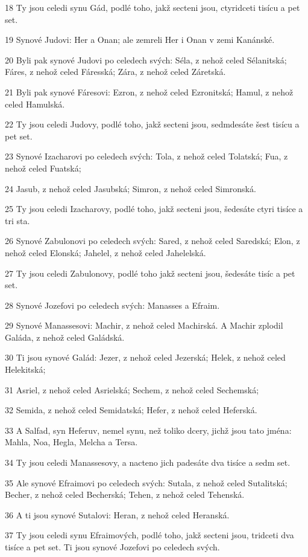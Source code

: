 \par 18 Ty jsou celedi synu Gád, podlé toho, jakž secteni jsou, ctyridceti tisícu a pet set.
\par 19 Synové Judovi: Her a Onan; ale zemreli Her i Onan v zemi Kanánské.
\par 20 Byli pak synové Judovi po celedech svých: Séla, z nehož celed Sélanitská; Fáres, z nehož celed Fáresská; Zára, z nehož celed Záretská.
\par 21 Byli pak synové Fáresovi: Ezron, z nehož celed Ezronitská; Hamul, z nehož celed Hamulská.
\par 22 Ty jsou celedi Judovy, podlé toho, jakž secteni jsou, sedmdesáte šest tisícu a pet set.
\par 23 Synové Izacharovi po celedech svých: Tola, z nehož celed Tolatská; Fua, z nehož celed Fuatská;
\par 24 Jasub, z nehož celed Jasubská; Simron, z nehož celed Simronská.
\par 25 Ty jsou celedi Izacharovy, podlé toho, jakž secteni jsou, šedesáte ctyri tisíce a tri sta.
\par 26 Synové Zabulonovi po celedech svých: Sared, z nehož celed Saredská; Elon, z nehož celed Elonská; Jahelel, z nehož celed Jahelelská.
\par 27 Ty jsou celedi Zabulonovy, podlé toho jakž secteni jsou, šedesáte tisíc a pet set.
\par 28 Synové Jozefovi po celedech svých: Manasses a Efraim.
\par 29 Synové Manassesovi: Machir, z nehož celed Machirská. A Machir zplodil Galáda, z nehož celed Galádská.
\par 30 Ti jsou synové Galád: Jezer, z nehož celed Jezerská; Helek, z nehož celed Helekitská;
\par 31 Asriel, z nehož celed Asrielská; Sechem, z nehož celed Sechemská;
\par 32 Semida, z nehož celed Semidatská; Hefer, z nehož celed Heferská.
\par 33 A Salfad, syn Heferuv, nemel synu, než toliko dcery, jichž jsou tato jména: Mahla, Noa, Hegla, Melcha a Tersa.
\par 34 Ty jsou celedi Manassesovy, a nacteno jich padesáte dva tisíce a sedm set.
\par 35 Ale synové Efraimovi po celedech svých: Sutala, z nehož celed Sutalitská; Becher, z nehož celed Becherská; Tehen, z nehož celed Tehenská.
\par 36 A ti jsou synové Sutalovi: Heran, z nehož celed Heranská.
\par 37 Ty jsou celedi synu Efraimových, podlé toho, jakž secteni jsou, tridceti dva tisíce a pet set. Ti jsou synové Jozefovi po celedech svých.
